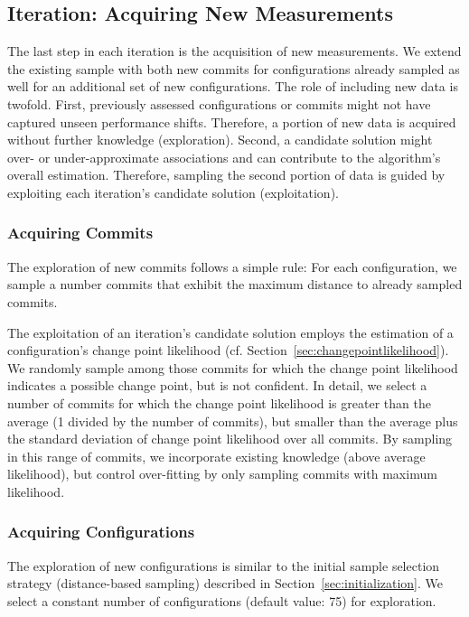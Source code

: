 \documentclass[sigconf]{acmart}
\begin{document}
	\subsection{Iteration: Acquiring New Measurements}\label{sec:acquisition}
	The last step in each iteration is the acquisition of new measurements. We extend the existing sample with both new commits for configurations already sampled as well for an additional set of new configurations. The role of including new data is twofold. First, previously assessed configurations or commits might not have captured unseen performance shifts. Therefore, a portion of new data is acquired without further knowledge (exploration). Second, a candidate solution might over- or under-approximate associations and can contribute to the algorithm's overall estimation. Therefore, sampling the second portion of data is guided by exploiting each iteration's candidate solution (exploitation).
	
	\subsubsection{Acquiring Commits}
	The exploration of new commits follows a simple rule: For each configuration, we sample a number commits that exhibit the maximum distance to already sampled commits. 
	
	The exploitation of an iteration's candidate solution employs the estimation of a configuration's change point likelihood (cf. Section~\ref{sec:changepointlikelihood}). We randomly sample among those commits for which the change point likelihood indicates a possible change point, but is not confident. In detail, we select a number of commits for which the change point likelihood is greater than the average (1 divided by the number of commits), but smaller than the average plus the standard deviation of change point likelihood over all commits. By sampling in this range of commits, we incorporate existing knowledge (above average likelihood), but control over-fitting by only sampling commits with maximum likelihood.
	
	\subsubsection{Acquiring Configurations}
	The exploration of new configurations is similar to the initial sample selection strategy (distance-based sampling) described in Section~\ref{sec:initialization}. We select a constant number of configurations (default value: 75) for exploration. 
	
\end{document}
